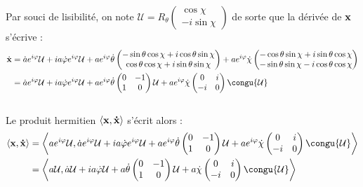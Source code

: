 \begin{demo}%
	Par souci de lisibilité, on note $\mathcal{U} = R_{\theta} \begin{pmatrix} \cos\chi \\ -i\sin\chi \end{pmatrix}$ de sorte que la dérivée de $\bf{x}$ s'écrive :
	\begin{align*}
		\dot{\bf{x}} 
			&= \dot{a}e^{i\varphi}\mathcal{U} + ia\dot{\varphi}e^{i\varphi} \mathcal{U} + ae^{i\varphi}\dot{\theta}\begin{pmatrix} -\sin\theta \cos\chi + i\cos\theta \sin\chi \\ \cos\theta \cos\chi + i\sin\theta \sin\chi \end{pmatrix} + ae^{i\varphi}\dot{\chi}\begin{pmatrix} -\cos\theta \sin\chi + i\sin\theta \cos\chi \\ -\sin\theta \sin\chi - i\cos\theta \cos\chi \end{pmatrix} \\
			&= \dot{a}e^{i\varphi}\mathcal{U} + ia\dot{\varphi}e^{i\varphi} \mathcal{U} + ae^{i\varphi}\dot{\theta}\begin{pmatrix} 0 & -1 \\ 1 & 0 \end{pmatrix}\mathcal{U} + ae^{i\varphi}\dot{\chi}\begin{pmatrix} 0 & i \\ -i & 0 \end{pmatrix}\congu{\mathcal{U}}
	\end{align*}
	\\
	Le produit hermitien $\langle \bf{x}, \dot{\bf{x}}\rangle$ s'écrit alors :
	\begin{align*}
		\langle \bf{x}, \dot{\bf{x}}\rangle 
			&= \left\langle ae^{i\varphi}\mathcal{U}, \dot{a}e^{i\varphi}\mathcal{U} + ia\dot{\varphi}e^{i\varphi} \mathcal{U} + ae^{i\varphi}\dot{\theta}\begin{pmatrix} 0 & -1 \\ 1 & 0 \end{pmatrix}\mathcal{U} + ae^{i\varphi}\dot{\chi}\begin{pmatrix} 0 & i \\ -i & 0 \end{pmatrix}\congu{\mathcal{U}}\right\rangle \\
			&= \left\langle a\mathcal{U}, \dot{a}\mathcal{U} + ia\dot{\varphi} \mathcal{U} + a\dot{\theta}\begin{pmatrix} 0 & -1 \\ 1 & 0 \end{pmatrix}\mathcal{U} + a\dot{\chi}\begin{pmatrix} 0 & i \\ -i & 0 \end{pmatrix}\congu{\mathcal{U}}\right\rangle \\

\end{align*}
\end{demo}
